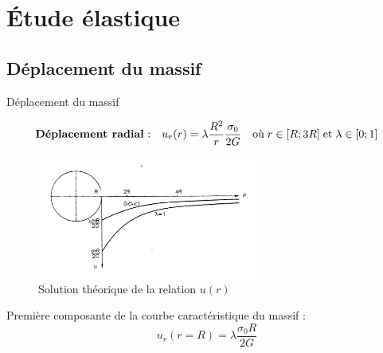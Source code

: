 \documentclass{beamer}
\begin{document}
\section{Étude élastique}

\subsection{Déplacement du massif}

\begin{frame}{Déplacement du massif}
    
\[\text{\textbf{Déplacement radial} :}\quad u_r (r)= \lambda \dfrac{R^2}{r} \dfrac{\sigma_0}{2G}\quad\text{où}\;r\in[R;3R]\;\text{et}\; \lambda\in[0;1]\]

\begin{figure}
    \centering
    \includegraphics[height=4cm]{Results_ur.png}
    \caption{\scriptsize{Solution théorique de la relation $u(r)$}}
    \label{Results_ur}
\end{figure}

Première composante de la courbe caractéristique du massif : \[u_r(r=R) = \lambda \dfrac{\sigma_0 R}{2G}\]


\end{frame}
\end{document}
